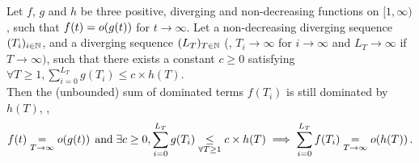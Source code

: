 \documentclass[12pt]{colt2018} %
\begin{document}
\begin{lemma}\label{lem:ControlLemmaSumOfSmallO}
    Let $f$, $g$ and $h$ be three positive, diverging and non-decreasing functions on $[1, \infty)$, such that
    $f(t) = \mathop{}\mathopen{}o\mathopen{}\left(g(t)\right)$ for $t\to\infty$.
    Let a non-decreasing diverging sequence $(T_i)_{i\in\mathbb{N}}$,
    and a diverging sequence $(L_T)_{T\in\mathbb{N}}$ (\ie, $T_i\to\infty$ for $i\to\infty$ and $L_T\to\infty$ if $T\to\infty)$,
    such that there exists a constant $c\geq0$ satisfying
    $\forall T\geq1, \sum\limits_{i=0}^{L_T} g(T_i) \leq c \times h(T)$.\\
    Then the (unbounded) sum of dominated terms $f(T_i)$ is still dominated by $h(T)$, \ie,
    \begin{align}\label{eq:ControlLemmaSumOfSmallO}
        f(t) \underset{T\to\infty}{=} \mathop{}\mathopen{}o\mathopen{}\left(g(t)\right)
        \;\text{and}\;
        \exists c\geq0, \sum_{i=0}^{L_T} g(T_i) \underset{\forall T\geq1}{\leq} c \times h(T)
        \implies
        \sum_{i=0}^{L_T} f(T_i) \underset{T\to\infty}{=} \mathop{}\mathopen{}o\mathopen{}\left(h(T)\right).
    \end{align}
\end{lemma}
\end{document}
